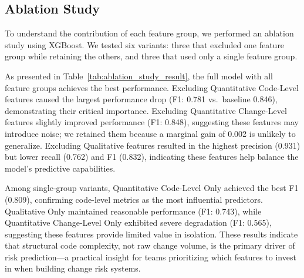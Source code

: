\subsection{Ablation Study}

To understand the contribution of each feature group, we performed an ablation study using XGBoost. We tested six variants: three that excluded one feature group while retaining the others, and three that used only a single feature group.



As presented in Table~\ref{tab:ablation_study_result}, the full model with all feature groups achieves the best performance. Excluding Quantitative Code-Level features caused the largest performance drop (F1: 0.781 vs.\ baseline 0.846), demonstrating their critical importance. Excluding Quantitative Change-Level features slightly improved performance (F1: 0.848), suggesting these features may introduce noise; we retained them because a marginal gain of 0.002 is unlikely to generalize. Excluding Qualitative features resulted in the highest precision (0.931) but lower recall (0.762) and F1 (0.832), indicating these features help balance the model's predictive capabilities.

Among single-group variants, Quantitative Code-Level Only achieved the best F1 (0.809), confirming code-level metrics as the most influential predictors. Qualitative Only maintained reasonable performance (F1: 0.743), while Quantitative Change-Level Only exhibited severe degradation (F1: 0.565), suggesting these features provide limited value in isolation. These results indicate that structural code complexity, not raw change volume, is the primary driver of risk prediction---a practical insight for teams prioritizing which features to invest in when building change risk systems.
